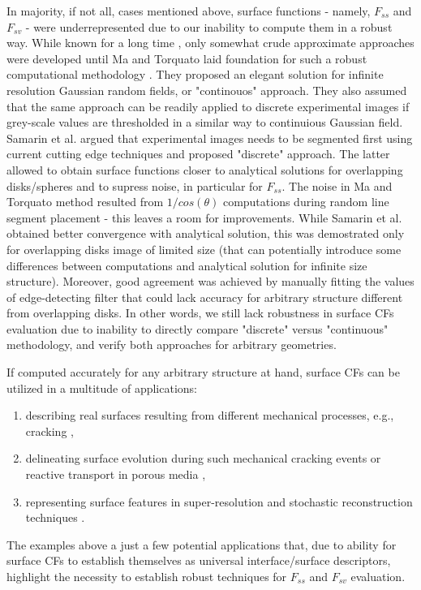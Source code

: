 \documentclass[reprint,amsmath,amssymb,aps,pre,showkeys,showpacs]{revtex4-1}
\begin{document}
In majority, if not all, cases mentioned above, surface functions - namely,
$F_{ss}$ and $F_{sv}$ - were underrepresented due to our inability to compute
them in a robust way. While known for a long time \cite{theory_in_MT}, only
somewhat crude approximate approaches \cite{crude_approx_inMT} were developed
until Ma and Torquato laid foundation for such a robust computational
methodology \cite{ma2018SS}. They proposed an elegant solution for infinite
resolution Gaussian random fields, or "continouos" approach. They also assumed
that the same approach can be readily applied to discrete experimental images if
grey-scale values are thresholded in a similar way to continuious Gaussian
field. Samarin et al. \cite{our_SS_paper} argued that experimental images needs
to be segmented first using current cutting edge techniques \cite{NNseg} and
proposed "discrete" approach. The latter allowed to obtain surface functions
closer to analytical solutions for overlapping disks/spheres and to supress
noise, in particular for $F_{ss}$. The noise in Ma and Torquato method resulted
from $1/cos(\theta)$ computations during random line segment placement - this
leaves a room for improvements. While Samarin et al. obtained better convergence
with analytical solution, this was demostrated only for overlapping disks image
of limited size (that can potentially introduce some differences between
computations and analytical solution for infinite size structure). Moreover,
good agreement was achieved by manually fitting the values of edge-detecting
filter that could lack accuracy for arbitrary structure different from
overlapping disks. In other words, we still lack robustness in surface CFs
evaluation due to inability to directly compare "discrete" versus "continuous"
methodology, and verify both approaches for arbitrary geometries.

If computed accurately for any arbitrary structure at hand, surface CFs can be
utilized in a multitude of applications:
\begin{enumerate}
  \item describing real surfaces resulting from different mechanical processes,
    e.g., cracking \cite{some_examples},
  \item delineating surface evolution \cite{chen2022} during such mechanical
    cracking events or reactive transport in porous media
    \cite{godinho2016,noiriel2021,prokhorov2022},
  \item representing surface features in super-resolution and stochastic
    reconstruction techniques \cite{chen2020super,janssens2020,karimpouli2022}.
\end{enumerate}
The examples above a just a few potential applications that, due to ability for
surface CFs to establish themselves as universal interface/surface descriptors,
highlight the necessity to establish robust techniques for $F_{ss}$ and $F_{sv}$
evaluation.
\end{document}
